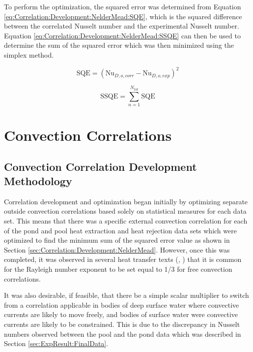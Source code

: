 
To perform the optimization, the squared error was determined from Equation \ref{eq:Correlation:Development:NelderMead:SQE}, which is the squared difference between the correlated Nusselt number and the experimental Nusselt number. Equation \ref{eq:Correlation:Development:NelderMead:SSQE} can then be used to determine the sum of the squared error which was then minimized using the simplex method.

\begin{equation}
	\mbox{SQE} = (\mbox{Nu}_{D,o,corr} - \mbox{Nu}_{D,o,exp})^2
	\label{eq:Correlation:Development:NelderMead:SQE}
\end{equation}

\begin{equation}
	\mbox{SSQE} = \sum_{n=1}^{N_{tot}} \mbox{SQE}
	\label{eq:Correlation:Development:NelderMead:SSQE}
\end{equation}


\section{Convection Correlations}
\label{sec:Correlation:IndivCorr}

\subsection{Convection Correlation Development Methodology}
\label{subsec:Correlation:Method}
	
Correlation development and optimization began initially by optimizing separate outside convection correlations based solely on statistical measures for each data set. This means that there was a specific external convection correlation for each of the pond and pool heat extraction and heat rejection data sets which were optimized to find the minimum sum of the squared error value as shown in Section \ref{sec:Correlation:Development:NelderMead}. However, once this was completed, it was observed in several heat transfer texts (\cite{IncroperaDewittBergmanLavine2007}, \cite{CengelGhajar2011}) that it is common for the Rayleigh number exponent to be set equal to 1/3 for free convection correlations.

It was also desirable, if feasible, that there be a simple scalar multiplier to switch from a correlation applicable in bodies of deep surface water where convective currents are likely to move freely, and bodies of surface water were convective currents are likely to be constrained. This is due to the discrepancy in Nusselt numbers observed between the pool and the pond data which was described in Section \ref{sec:ExpResult:FinalData}.

